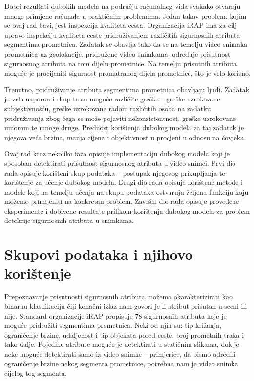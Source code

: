 \documentclass[times, utf8, diplomski, numeric]{fer}
\begin{document}
Dobri rezultati dubokih modela na području računalnog vida svakako otvaraju mnoge primjene računala u praktičnim problemima. 
Jedan takav problem, kojim se ovaj rad bavi, jest inspekcija kvaliteta cesta. 
Organizacija iRAP  ima za cilj upravo inspekciju kvaliteta ceste pridruživanjem različitih sigurnosnih atributa segmentima prometnica.
Zadatak se obavlja tako da se na temelju video snimaka prometnica uz geolokacije, pridružene video snimkama, određuje prisutnost sigurnosnog atributa na tom dijelu prometnice.
Na temelju prisutnih atributa moguće je procijeniti sigurnost promatranog dijela prometnice, što je vrlo korisno.

Trenutno, pridruživanje atributa segmentima prometnica obavljaju ljudi. 
Zadatak je vrlo naporan i skup te su moguće različite greške -- greške uzrokovane subjektivnošću, greške uzrokovane radom različitih osoba na zadatku pridruživanja zbog čega se može pojaviti nekonzistentnost, greške uzrokovane umorom te mnoge druge.
Prednost korištenja dubokog modela za taj zadatak je njegova veća brzina, manja cijena i objektivnost u procjeni u odnosu na čovjeka.

Ovaj rad kroz nekoliko faza opisuje implementaciju dubokog modela koji je sposoban detektirati prisutnost sigurnosnog atributa u video snimci.
Prvi dio rada opisuje korišteni skup podataka -- postupak njegovog prikupljanja te korištenje za učenje dubokog modela.
Drugi dio rada opisuje korištene metode i modele koji na temelju učenja na skupu podataka ostvaruju željenu funkciju koju možemo primijeniti na konkretan problem.
Završni dio rada opisuje provedene eksperimente i dobivene rezultate prilikom korištenja dubokog modela za problem detekcije sigurnosnih atributa u snimkama.


\chapter{Skupovi podataka i njihovo korištenje} \label{chapter:skupovi_podataka}
 
Prepoznavanje prisutnosti sigurnosnih atributa možemo okarakterizirati kao binarnu klasifikaciju čiji konačni izlaz nam govori je li atribut prisutan u sceni ili nije.
Standard organizacije iRAP propisuje 78 sigurnosnih atributa \citep{man:ftts_irap_attributes} koje je moguće pridružiti segmentima prometnica.
Neki od njih su: tip križanja, ograničenje brzine, udaljenost i tip objekata pored ceste, broj prometnih traka i tako dalje.
Pojedine atribute moguće je detektirati u statičnim slikama, dok je neke moguće detektirati samo iz video snimke -- primjerice, da bismo odredili ograničenje brzine nekog segmenta prometnice, potrebna nam je video snimka cijelog tog segmenta.
\end{document}
